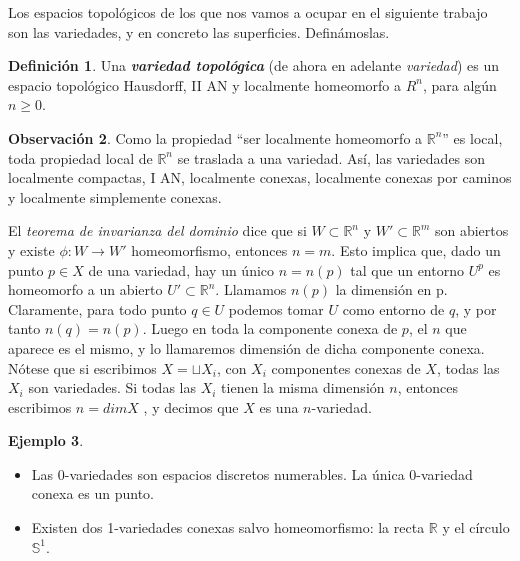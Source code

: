 \documentclass[10pt]{report}
\newcommand{\R}{\mathbb{R}}
\theoremstyle{definition}
\newtheorem{defin}{Definición}[section]
\newtheorem{obs}[defin]{Observación}
\newtheorem{eje}[defin]{Ejemplo}
\begin{document}
Los espacios topológicos de los que nos vamos a ocupar en el siguiente trabajo son las variedades, y en concreto las superficies. Definámoslas.

\begin{defin}%
Una \textbf{\emph{variedad topológica}} (de ahora en adelante \emph{variedad}) es un espacio topológico Hausdorff, II AN y localmente homeomorfo a $R^n$, para algún $n\geq 0$.
\end{defin}

\begin{obs}%
Como la propiedad ``ser localmente homeomorfo a $\R^n$'' es local, toda propiedad local de $\R^n$ se traslada a una variedad. Así, las variedades son localmente compactas, I AN, localmente conexas, localmente conexas por caminos y localmente simplemente conexas.\\
\end{obs}



El \textit{teorema de invarianza del dominio} dice que si $W\subset \R^n$ y $W'\subset \R^m$ son abiertos y existe $\phi: W \rightarrow W'$ homeomorfismo, entonces $n=m$. Esto implica que, dado un punto $p\in X$ de una variedad, hay un único $n=n(p)$ tal que un entorno $U^p$ es homeomorfo a un abierto $U'\subset \R^n$. Llamamos $n(p)$ la dimensión en p. Claramente, para todo punto $q\in U$ podemos tomar $U$ como entorno de $q$, y por tanto $n(q)=n(p)$. Luego en toda la componente conexa de $p$, el $n$ que aparece es el mismo, y lo llamaremos dimensión de dicha componente conexa. Nótese que si escribimos $X=\sqcup X_i$, con $X_i$ componentes conexas de $X$, todas las $X_i$ son variedades. Si todas las $X_i$ tienen la misma dimensión $n$, entonces escribimos $n=dim X$ , y decimos que $X$ es una $n$-variedad.\\



\begin{eje}%
\begin{itemize}
\item Las 0-variedades son espacios discretos numerables. La única 0-variedad conexa es un punto.
\item Existen dos 1-variedades conexas salvo homeomorfismo: la recta $\R$ y el círculo $\mathbb{S}^1$.
\end{itemize}
\end{eje}
\end{document}
